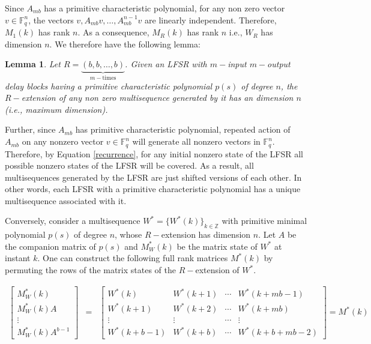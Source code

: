 \documentclass[letterpaper, 12 pt]{article}  \usepackage{amssymb}
\newtheorem{lemma}[theorem]{Lemma}
\newcommand{\F}{\mathbb{F}}
\begin{document}
Since $A_{mb}$ has a primitive characteristic polynomial, for any non zero
vector $v \in \F_q^n$, the vectors $v,A_{mb}v,\ldots,A_{mb}^{n-1}v$ are
linearly independent. Therefore, $M_1(k)$ has rank $n$. As a consequence,
$M_R(k)$ has rank $n$ i.e., $W_R$ has dimension $n$. We therefore have the
following lemma:

\begin{lemma}
Let $R = \underbrace{(b,b,\ldots,b)}_{m-\textrm{times}}$. Given an LFSR with
$m-$input $m-$output delay blocks having a primitive characteristic polynomial
$p(s)$ of degree $n$, the $R-$extension of any non zero multisequence generated
by it has an dimension $n$ (i.e., maximum dimension).
\end{lemma}

Further, since $A_{mb}$ has primitive characteristic polynomial, repeated
action of $A_{mb}$ on any nonzero vector $v\in \F_q^n$ will generate all
nonzero vectors in $\F_q^n$. Therefore, by Equation \eqref{recurrence}, for any
initial nonzero state of the LFSR all possible nonzero states of the LFSR will
be covered. As a result, all multisequences generated by the LFSR are just
shifted versions of each other. In other words, each LFSR with a primitive
characteristic polynomial has a unique multisequence associated with it.

Conversely, consider a multisequence $W^*= \{W^*(k)\}_{k \in \mathbb{Z}}$ with
primitive minimal polynomial $p(s)$ of degree $n$, whose $R-$extension has
dimension $n$. Let $A$ be the companion matrix of $p(s)$ and $M_W^*(k)$ be the 
matrix state of $W^*$ at instant $k$. One can construct the following full rank
matrices $M^*(k)$ by permuting the rows of the matrix states of the
$R-$extension of $W^*$.

{\small
 \begin{eqnarray}
\label{consmat}
\left[\begin{matrix} M_W^*(k)\\ M_W^*(k)A\\ \vdots \\
M_W^*(k)A^{b-1} \end{matrix}\right]  &=& \left[\begin{matrix}
 W^*(k) & W^*({k+1}) & \cdots & W^*({k+mb-1})\\
 W^*({k+1}) & W^*({k+2}) & \cdots & W^*({k+mb})\\
 \vdots & \vdots & \cdots & \vdots\\
 W^*({k+b-1}) &  W^*({k+b}) & \cdots & W^*({k+b+mb-2})
\end{matrix}\right] = M^*(k)
 \end{eqnarray}}
\end{document}
